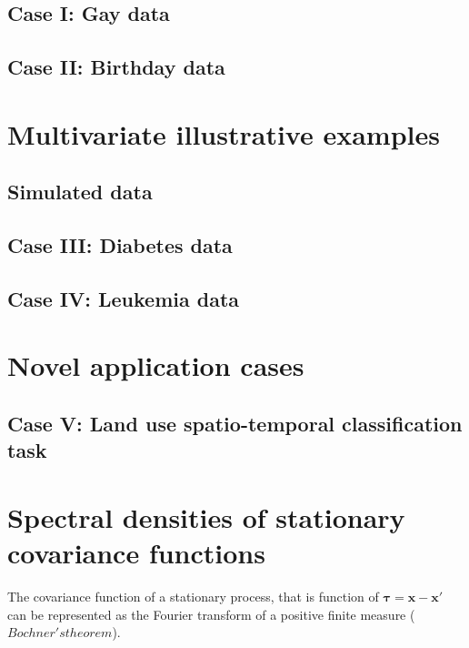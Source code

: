 \documentclass[]{interact}
\theoremstyle{plain}%
\theoremstyle{definition}
\theoremstyle{remark}
\begin{document}
\subsection{Case I: Gay data}\label{sec:bf_caseII}
\subsection{Case II: Birthday data}\label{sec:bf_caseIII}

\vspace{3mm}
\section{Multivariate illustrative examples}\label{sec:gp_examplesMulti}
\subsection{Simulated data}\label{sec:bf_toyexampleMulti}
\subsection{Case III: Diabetes data}\label{sec:bf_caseIV}
\subsection{Case IV: Leukemia data}\label{sec:bf_caseV}

\vspace{3mm}
\section{Novel application cases}\label{sec:bf_novelcases}
\subsection{Case V: Land use spatio-temporal classification task}\label{sec:bf_caseVII}

\vspace{3mm}
\appendix

\section{Spectral densities of stationary covariance functions}

The covariance function of a stationary process, that is function of $\boldsymbol{\tau}=\mathbf{x-x'}$ can be represented as the Fourier transform of a positive finite measure ($Bochner's theorem$). 
\end{document}
